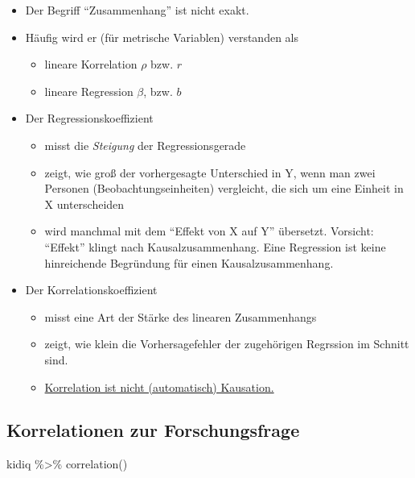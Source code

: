 \documentclass[
  a4paper,
  DIV=11]{scrreprt}
\newenvironment{Shaded}{\begin{snugshade}}{\end{snugshade}}
\newcommand{\FunctionTok}[1]{\textcolor[rgb]{0.28,0.35,0.67}{#1}}
\newcommand{\NormalTok}[1]{\textcolor[rgb]{0.00,0.23,0.31}{#1}}
\newcommand{\SpecialCharTok}[1]{\textcolor[rgb]{0.37,0.37,0.37}{#1}}
\providecommand{\tightlist}{%
  \setlength{\itemsep}{0pt}\setlength{\parskip}{0pt}}\usepackage{longtable,booktabs,array}
\theoremstyle{definition}
\theoremstyle{remark}
\begin{document}
\begin{itemize}
\tightlist
\item
  Der Begriff ``Zusammenhang'' ist nicht exakt.
\item
  Häufig wird er (für metrische Variablen) verstanden als

  \begin{itemize}
  \tightlist
  \item
    lineare Korrelation \(\rho\) bzw. \(r\)
  \item
    lineare Regression \(\beta\), bzw. \(b\)
  \end{itemize}
\item
  Der Regressionskoeffizient

  \begin{itemize}
  \tightlist
  \item
    misst die \emph{Steigung} der Regressionsgerade
  \item
    zeigt, wie groß der vorhergesagte Unterschied in Y, wenn man zwei
    Personen (Beobachtungseinheiten) vergleicht, die sich um eine
    Einheit in X unterscheiden
  \item
    wird manchmal mit dem ``Effekt von X auf Y'' übersetzt. Vorsicht:
    ``Effekt'' klingt nach Kausalzusammenhang. Eine Regression ist keine
    hinreichende Begründung für einen Kausalzusammenhang.
  \end{itemize}
\item
  Der Korrelationskoeffizient

  \begin{itemize}
  \tightlist
  \item
    misst eine Art der Stärke des linearen Zusammenhangs
  \item
    zeigt, wie klein die Vorhersagefehler der zugehörigen Regrssion im
    Schnitt sind.
  \item
    \href{https://xkcd.com/552/}{Korrelation ist nicht (automatisch)
    Kausation.}
  \end{itemize}
\end{itemize}

\hypertarget{korrelationen-zur-forschungsfrage}{%
\subsection{Korrelationen zur
Forschungsfrage}\label{korrelationen-zur-forschungsfrage}}

\begin{Shaded}
\begin{Highlighting}[]
\NormalTok{kidiq }\SpecialCharTok{\%\textgreater{}\%} 
  \FunctionTok{correlation}\NormalTok{()}
\end{Highlighting}
\end{Shaded}
\end{document}

